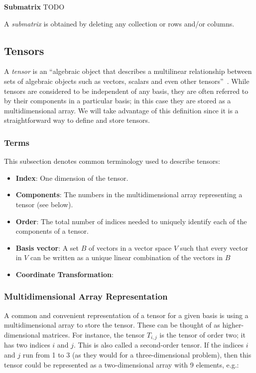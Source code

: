 \documentclass[12pt]{article}
\begin{document}
\medskip
\noindent\textbf{Submatrix}
TODO 

\noindent A \textit{submatrix} is obtained by deleting any collection or rows and/or columns.


\subsection{Tensors}
A \textit{tensor} is an ``algebraic object that describes a multilinear
relationship between sets of algebraic objects such as vectors, scalars
and even other tensors''~\citep{Wikipedia_Tensors_2025}. While tensors
are considered to be independent of any basis, they are often referred
to by their components in a particular basis; in this case they are
stored as a multidimensional array. We will take advantage of this 
definition since it is a straightforward way to define and store tensors.

\subsubsection{Terms}
This subsection denotes common terminology used to describe tensors:

\begin{itemize}
\item \textbf{Index}: One dimension of the tensor.
\item \textbf{Components}: The numbers in the multidimensional array representing a
      tensor (see below).
\item \textbf{Order}: The total number of indices needed to uniquely identify each of the 
      components of a tensor.
\item \textbf{Basis vector}: A set $B$ of vectors in a vector space $V$ such that every 
      vector in $V$ can be written as a unique linear combination of the vectors 
      in $B$~\citep{Wikipedia_Basis_2025}
\item \textbf{Coordinate Transformation}: 
\end{itemize}

\subsubsection{Multidimensional Array Representation}
A common and convenient representation of a tensor for a given basis is using a 
multidimensional array to store the tensor. These can be thought of as higher-dimensional
matrices. For instance, the tensor $T_{i,j}$ is
the tensor of order two; it has two indices $i$ and $j$. This is also called a
second-order tensor. If the indices $i$ and $j$ run from 1 to 3 (as they would for
a three-dimensional problem), then this tensor could be represented as a two-dimensional
array with 9 elements, e.g.:
\end{document}
